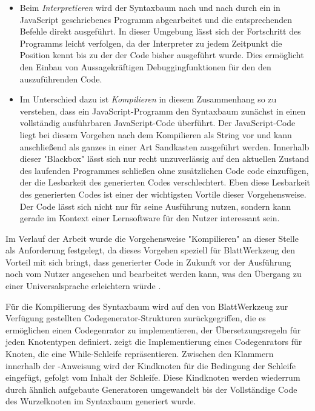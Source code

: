 \begin{itemize}
  \item Beim \emph{Interpretieren} wird der Syntaxbaum nach und nach durch ein in JavaScript geschriebenes Programm abgearbeitet und die entsprechenden Befehle direkt ausgeführt. In dieser Umgebung lässt sich der Fortschritt des Programms leicht verfolgen, da der Interpreter zu jedem Zeitpunkt die Position kennt bis zu der der Code bisher ausgeführt wurde. Dies ermöglicht den Einbau von Aussagekräftigen Debuggingfunktionen für den den auszuführenden Code.
  \item Im Unterschied dazu ist \emph{Kompilieren} in diesem Zusammenhang so zu verstehen, dass ein JavaScript-Programm den Syntaxbaum zunächst in einen vollständig ausführbaren JavaScript-Code überführt. Der JavaScript-Code liegt bei diesem Vorgehen nach dem Kompilieren als String vor und kann anschließend als ganzes in einer Art Sandkasten ausgeführt werden. Innerhalb dieser "Blackbox" lässt sich nur recht unzuverlässig auf den aktuellen Zustand des laufenden Programmes schließen ohne zusätzlichen Code code einzufügen, der die Lesbarkeit des generierten Codes verschlechtert. Eben diese Lesbarkeit des generierten Codes ist einer der wichtigsten Vortile dieser Vorgehensweise. Der Code lässt sich nicht nur für seine Ausführung nutzen, sondern kann gerade im Kontext einer Lernsoftware für den Nutzer interessant sein.
\end{itemize}

Im Verlauf der Arbeit wurde die Vorgehensweise "Kompilieren" an dieser Stelle als Anforderung festgelegt, da dieses Vorgehen speziell für BlattWerkzeug den Vorteil mit sich bringt, dass generierter Code in Zukunft vor der Ausführung noch vom Nutzer angesehen und bearbeitet werden kann, was den Übergang zu einer Universalsprache erleichtern würde .

Für die Kompilierung des Syntaxbaum wird auf den von BlattWerkzeug zur Verfügung gestellten Codegenerator-Strukturen zurückgegriffen, die es ermöglichen einen Codegenrator zu implementieren, der Übersetzungsregeln für jeden Knotentypen definiert.  zeigt die Implementierung eines Codegenrators für Knoten, die eine While-Schleife repräsentieren. Zwischen den Klammern innerhalb der -Anweisung wird der Kindknoten für die Bedingung der Schleife eingefügt, gefolgt vom Inhalt der Schleife. Diese Kindknoten werden wiederrum durch ähnlich aufgebaute Generatoren umgewandelt bis der Vollständige Code des Wurzelknoten im Syntaxbaum generiert wurde.

